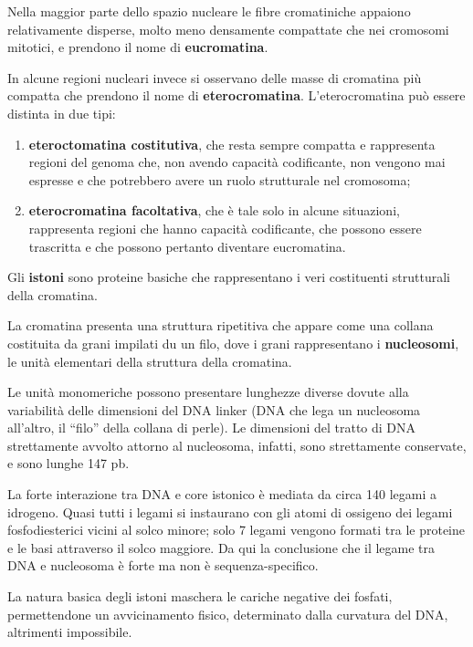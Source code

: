 \documentclass[]{article}
\begin{document}
Nella maggior parte dello spazio nucleare le fibre cromatiniche appaiono
relativamente disperse, molto meno densamente compattate che nei
cromosomi mitotici, e prendono il nome di \textbf{eucromatina}.

In alcune regioni nucleari invece si osservano delle masse di cromatina
più compatta che prendono il nome di \textbf{eterocromatina}.
L'eterocromatina può essere distinta in due tipi:

\begin{enumerate}
\def\labelenumi{\arabic{enumi}.}
\itemsep1pt\parskip0pt
\item
  \textbf{eteroctomatina costitutiva}, che resta sempre compatta e
  rappresenta regioni del genoma che, non avendo capacità codificante,
  non vengono mai espresse e che potrebbero avere un ruolo strutturale
  nel cromosoma;
\item
  \textbf{eterocromatina facoltativa}, che è tale solo in alcune
  situazioni, rappresenta regioni che hanno capacità codificante, che
  possono essere trascritta e che possono pertanto diventare
  eucromatina.
\end{enumerate}

Gli \textbf{istoni} sono proteine basiche che rappresentano i veri
costituenti strutturali della cromatina.

La cromatina presenta una struttura ripetitiva che appare come una
collana costituita da grani impilati du un filo, dove i grani
rappresentano i \textbf{nucleosomi}, le unità elementari della struttura
della cromatina.

Le unità monomeriche possono presentare lunghezze diverse dovute alla
variabilità delle dimensioni del DNA linker (DNA che lega un nucleosoma
all'altro, il ``filo'' della collana di perle). Le dimensioni del tratto
di DNA strettamente avvolto attorno al nucleosoma, infatti, sono
strettamente conservate, e sono lunghe 147 pb.

La forte interazione tra DNA e core istonico è mediata da circa 140
legami a idrogeno. Quasi tutti i legami si instaurano con gli atomi di
ossigeno dei legami fosfodiesterici vicini al solco minore; solo 7
legami vengono formati tra le proteine e le basi attraverso il solco
maggiore. Da qui la conclusione che il legame tra DNA e nucleosoma è
forte ma non è sequenza-specifico.

La natura basica degli istoni maschera le cariche negative dei fosfati,
permettendone un avvicinamento fisico, determinato dalla curvatura del
DNA, altrimenti impossibile.
\end{document}
